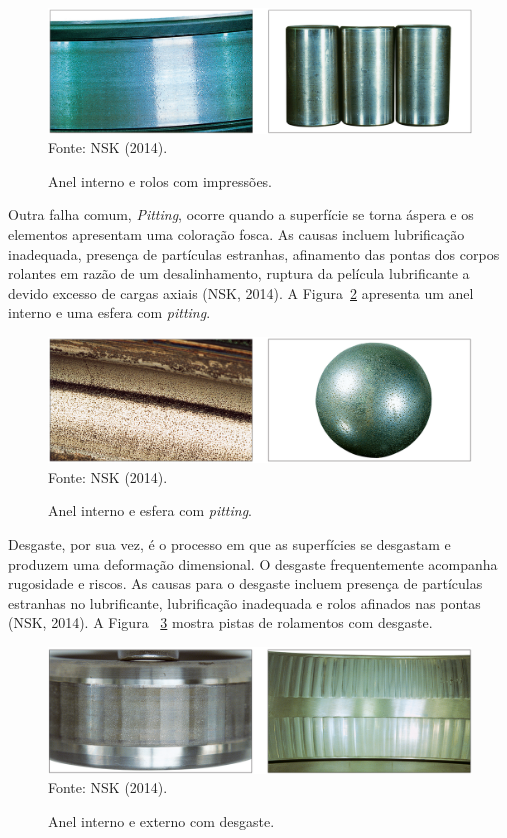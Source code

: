 \documentclass[
	12pt,				
	oneside,			
	a4paper,			
	english,			
	brazil,			
	]{abntex2ppgsi}
\begin{document}
\begin{figure}[H]
\centering
\caption {Anel interno e rolos com impressões.}
\includegraphics[width=\textwidth,height=\textheight,keepaspectratio]{impressoes_nsk} \\
Fonte: NSK (2014).
\label{impressoes_nsk}
\end{figure}

Outra falha comum, \textit{Pitting}, ocorre quando a superfície se torna áspera e os elementos apresentam uma coloração fosca. As causas incluem lubrificação inadequada, presença de partículas estranhas, afinamento das pontas dos corpos rolantes em razão de um desalinhamento, ruptura da película lubrificante a devido excesso de cargas axiais (NSK, 2014). A Figura~\ref{pitting_nsk} apresenta um anel interno e uma esfera com \textit{pitting}.

\begin{figure}[H]
\centering
\caption {Anel interno e esfera com \textit{pitting}.}
\includegraphics[width=\textwidth,height=\textheight,keepaspectratio]{pitting_nsk} \\
Fonte: NSK (2014).
\label{pitting_nsk}
\end{figure}

Desgaste, por sua vez, é o processo em que as superfícies se desgastam e produzem uma deformação dimensional. O desgaste frequentemente acompanha rugosidade e riscos. As causas para o desgaste incluem presença de partículas estranhas no lubrificante, lubrificação inadequada e rolos afinados nas pontas (NSK, 2014). A Figura ~\ref{desgaste_nsk} mostra pistas de rolamentos com desgaste.

\begin{figure}[H]
\centering
\caption {Anel interno e externo com desgaste.}
\includegraphics[width=\textwidth,height=\textheight,keepaspectratio]{desgaste_nsk} \\
Fonte: NSK (2014).
\label{desgaste_nsk}
\end{figure}
\end{document}
